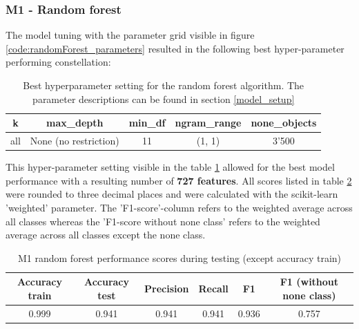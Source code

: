\subsubsection{M1 - Random forest}
The model tuning with the parameter grid visible in figure \ref{code:randomForest_parameters} resulted in the following best hyper-parameter performing constellation:\\

\begin{table}[h!]
\begin{center}
\caption{Best hyperparameter setting for the random forest algorithm. The parameter descriptions can be found in section \ref{model_setup}}\vspace{1ex}
\label{tab:m1_randomForest_bestParams}
\begin{tabular}{ccccc}\hline
k & max\_depth & min\_df & ngram\_range & none\_objects \\ \hline
all & None (no restriction) & 11 & (1, 1) & 3'500 \\ \hline
\end{tabular}
\end{center}
\end{table}

This hyper-parameter setting visible in the table \ref{tab:m1_randomForest_bestParams} allowed for the best model performance with a resulting number of \textbf{727 features}. All scores listed in table \ref{tab:m1_randomForest_bestscores} were rounded to three decimal places and were calculated with the scikit-learn 'weighted' parameter. The 'F1-score'-column refers to the weighted average across all classes whereas the 'F1-score without none class' refers to the weighted average across all classes except the none class.

\begin{table}[h!]
\begin{center}
\caption{M1 random forest performance scores during testing (except accuracy train)}\vspace{1ex}
\label{tab:m1_randomForest_bestscores}
\begin{tabular}{cccccc}\hline
Accuracy train & Accuracy test & Precision & Recall & F1 & F1 (without none class)\\ \hline
0.999 & 0.941 & 0.941 & 0.941 & 0.936 & 0.757 \\ \hline
\end{tabular}
\end{center}
\end{table}

